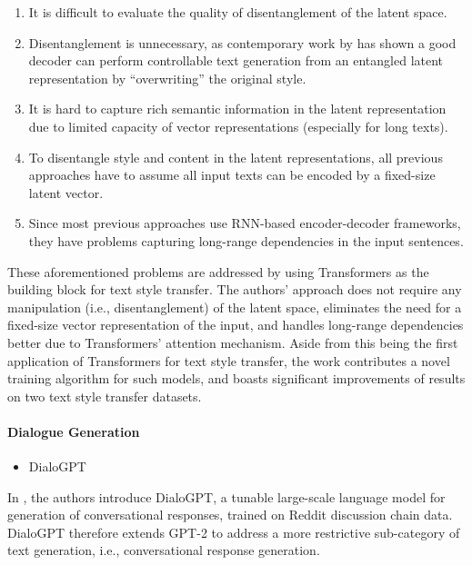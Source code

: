 \begin{enumerate}
    \item It is difficult to evaluate the quality of disentanglement of the latent space.
    \item Disentanglement is unnecessary, as contemporary work by \cite{lample2018multipleattribute} has shown a good decoder can perform controllable text generation from an entangled latent representation by ``overwriting'' the original style.
    \item It is hard to capture rich semantic information in the latent representation due to limited capacity of vector representations (especially for long texts).
    \item To disentangle style and content in the latent representations, all previous approaches have to assume all input texts can be encoded by a fixed-size latent vector.
    \item Since most previous approaches use RNN-based encoder-decoder frameworks, they have problems capturing long-range dependencies in the input sentences.
\end{enumerate}

These aforementioned problems are addressed by \cite{dai2019style} using Transformers \citep{vaswani2017attention} as the building block for text style transfer. The authors' approach does not require any manipulation (i.e., disentanglement) of the latent space, eliminates the need for a fixed-size vector representation of the input, and handles long-range dependencies better due to Transformers' attention mechanism. Aside from this being the first application of Transformers for text style transfer, the work contributes a novel training algorithm for such models, and boasts significant improvements of results on two text style transfer datasets.

\paragraph{Dialogue Generation}
\begin{itemize}
    \item DialoGPT
\end{itemize}

In \cite{zhang2019dialogpt}, the authors introduce DialoGPT, a tunable large-scale language model for generation of conversational responses, trained on Reddit discussion chain data. DialoGPT therefore extends GPT-2 \cite{radford2019language} to address a more restrictive sub-category of text generation, i.e., conversational response generation.  

